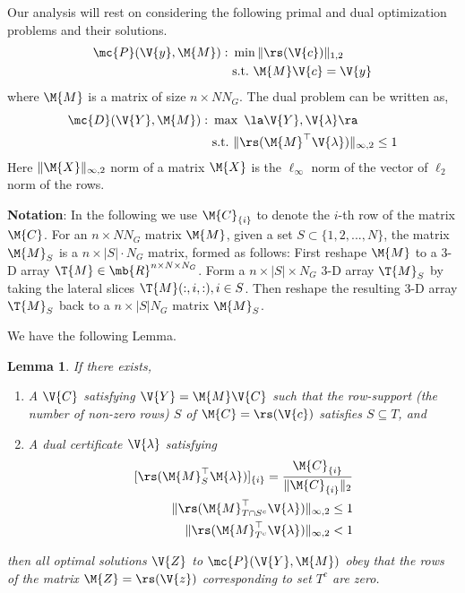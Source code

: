 \documentclass[conference]{IEEEtran}
\newtheorem{lemma}[theorem]{Lemma}
\begin{document}
Our analysis will rest on considering the following primal and dual optimization problems and their solutions. 
\begin{align}
\mc{P}(\V{y},\M{M}): \,\, &\min \| \rs(\V{c})\|_{1,2} \\
& \mbox{s.t.}\,\, \M{M}\V{c} = \V{y}
\end{align}
where $\M{M}$ is a matrix of size $n \times N N_G$. The dual problem can be written as, 
\begin{align}
\mc{D}(\V{Y},\M{M}): \,\, &\max \,\, \la \V{Y}, \V{\lambda}\ra \\
& \mbox{s.t.}\,\, \|\rs(\M{M}^{\top}\V{\lambda})\|_{\infty,2} \leq 1
\end{align}
Here $\| \M{X} \|_{\infty,2}$ norm of a matrix $\M{X}$ is the $\ell_\infty$ norm of the vector of $\ell_2$ norm of the rows. 

\textbf{Notation}: In the following we use $\M{C}_{\{i\}}$ to denote the $i$-th row of the matrix $\M{C}$. For an $n \times N N_G$ matrix $\M{M}$, given a set $S \subset \{1,2,...,N\}$, the matrix $\M{M}_S$ is a $n \times |S|\cdot N_G$ matrix, formed as follows: First reshape $\M{M}$ to a 3-D array $\T{M} \in \mb{R}^{n \times N \times N_G}$.  Form a $n \times |S| \times N_G$ 3-D array $\T{M}_S$ by taking the lateral slices $\T{M}(:,i,:), i \in S$. Then reshape the resulting 3-D array $\T{M}_S$ back to a $n \times |S|N_G$ matrix $\M{M}_S$. 

We have the following Lemma. 
\begin{lemma}
\label{lem:prim_dual}
If there exists,
\begin{enumerate}
\item A $\V{C}$ satisfying $\V{Y} = \M{M}\V{C}$ such that the row-support (the number of non-zero rows) $S$ of $\M{C}= \rs(\V{c})$ satisfies $S \subseteq T$, and
\item A dual certificate $\V{\lambda}$ satisfying 
\begin{align}
\label{eq:c1} [\rs(\M{M}_{S}^{\top} \M{\lambda})]_{\{i\}}  = \frac{\M{C}_{\{i\}}}{\|\M{C}_{\{i\}}\|_2} \\
\label{eq:c2}  \|\rs(\M{M}_{T\cap S^c}^{\top} \V{\lambda})\|_{\infty,2} \leq 1 \\
\label{eq:c3} \|\rs(\M{M}_{T^c}^{\top}\V{\lambda})\|_{\infty,2} < 1
\end{align}
\end{enumerate}
then all optimal solutions $\V{Z}$ to $\mc{P}(\V{Y},\M{M})$ obey that the rows of the matrix $\M{Z} = \rs(\V{z})$ corresponding to set $T^c$ are zero. 
\end{lemma}
\end{document}
